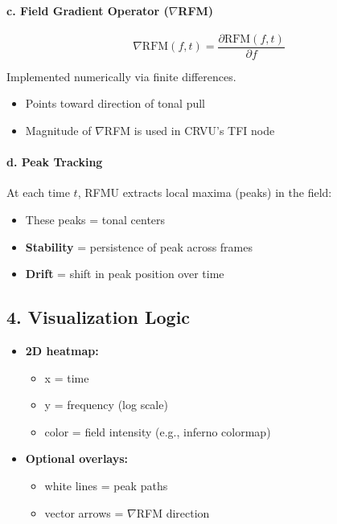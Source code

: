 \documentclass{article}
\begin{document}
\paragraph{c. Field Gradient Operator ($\nabla$RFM)}

\[
\nabla \text{RFM}(f, t) = \frac{\partial \text{RFM}(f, t)}{\partial f}
\]

Implemented numerically via finite differences.

\begin{itemize}
    \item Points toward direction of tonal pull
    \item Magnitude of $\nabla$RFM is used in CRVU’s TFI node
\end{itemize}

\paragraph{d. Peak Tracking}

At each time $t$, RFMU extracts local maxima (peaks) in the field:

\begin{itemize}
    \item These peaks = tonal centers
    \item \textbf{Stability} = persistence of peak across frames
    \item \textbf{Drift} = shift in peak position over time
\end{itemize}

\subsection*{4. Visualization Logic}

\begin{itemize}
    \item \textbf{2D heatmap:}
    \begin{itemize}
        \item x = time
        \item y = frequency (log scale)
        \item color = field intensity (e.g., inferno colormap)
    \end{itemize}
    \item \textbf{Optional overlays:}
    \begin{itemize}
        \item white lines = peak paths
        \item vector arrows = $\nabla$RFM direction
    \end{itemize}
\end{itemize}
\end{document}

